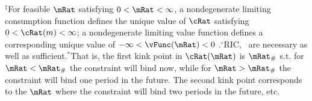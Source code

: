 \begin{table}
\parbox{\TableWidth}{\footnotesize         $^{\ddagger}$For feasible $\mRat$ satisfying $0 < \mRat < \infty$, a nondegenerate limiting consumption function defines the unique value of $\cRat$ satisfying $0 < \cRat(m) < \infty$; a nondegenerate limiting value function defines a corresponding unique value of $-\infty < \vFunc(\mRat) < 0$ .\phantom{~~}$^{\circ}$RIC, \FHWC~are necessary as well as sufficient.\phantom{~~}$^{\ast}$That is, the first kink point in $\cRat(\mRat)$ is $\mRat_{\#}$ s.t. for $\mRat < \mRat_{\#}$ the constraint will bind now, while for $\mRat > \mRat_{\#}$ the constraint will bind one period in the future.  The second kink point corresponds to the $\mRat$ where the constraint will bind two periods in the future, etc.} %
\end{table}

